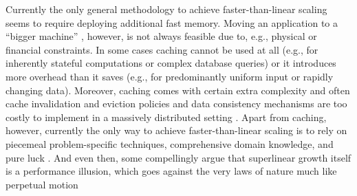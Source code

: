 Currently the only general methodology to achieve faster-than-linear scaling seems to require deploying additional fast memory. Moving an application to a ``bigger machine'' \cite{dobb-2}, however, is not always feasible due to, e.g., physical or financial constraints.  In some cases caching cannot be used at all (e.g., for inherently stateful computations or complex database queries) or it introduces more overhead than it saves (e.g., for predominantly uniform input or rapidly changing data).  Moreover, caching comes with certain extra complexity and often cache invalidation and eviction policies and data consistency mechanisms are too costly to implement in a massively distributed setting \cite{271208}. Apart from caching, however, currently the only way to achieve faster-than-linear scaling is to rely on piecemeal problem-specific techniques, comprehensive domain knowledge, and pure luck \cite{7733347, 80148}. And even then, some compellingly argue that superlinear growth itself is a performance illusion, which goes against the very laws of nature much like perpetual motion \cite{gunther-hotsos, 10.1145/2773212.2789974}



